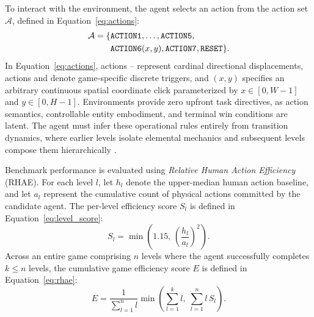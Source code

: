 To interact with the environment, the agent selects an action from the action set $\mathcal{A}$, defined in Equation~\eqref{eq:actions}:
\begin{equation}
\label{eq:actions}
\begin{aligned}
\mathcal{A} = \{ & \texttt{ACTION1}, \dots, \texttt{ACTION5}, \\
                 & \texttt{ACTION6}(x,y), \texttt{ACTION7}, \texttt{RESET} \}.
\end{aligned}
\end{equation}
In Equation~\eqref{eq:actions}, actions -- represent cardinal directional displacements, actions  and  denote game-specific discrete triggers, and $(x,y)$ specifies an arbitrary continuous spatial coordinate click parameterized by $x \in [0, W-1]$ and $y \in [0, H-1]$. Environments provide zero upfront task directives, as action semantics, controllable entity embodiment, and terminal win conditions are latent. The agent must infer these operational rules entirely from transition dynamics, where earlier levels isolate elemental mechanics and subsequent levels compose them hierarchically \citep{spelke2007core}.

Benchmark performance is evaluated using \emph{Relative Human Action Efficiency} (RHAE). For each level $l$, let $h_l$ denote the upper-median human action baseline, and let $a_l$ represent the cumulative count of physical actions committed by the candidate agent. The per-level efficiency score $S_l$ is defined in Equation~\eqref{eq:level_score}:
\begin{equation}
\label{eq:level_score}
S_l = \min\!\left(1.15,\, \left(\frac{h_l}{a_l}\right)^2\right).
\end{equation}
Across an entire game comprising $n$ levels where the agent successfully completes $k \le n$ levels, the cumulative game efficiency score $E$ is defined in Equation~\eqref{eq:rhae}:
\begin{equation}
\label{eq:rhae}
E = \frac{1}{\sum_{l=1}^n l} \min\!\left(\sum_{l=1}^k l,\; \sum_{l=1}^n l\, S_l\right).
\end{equation}

